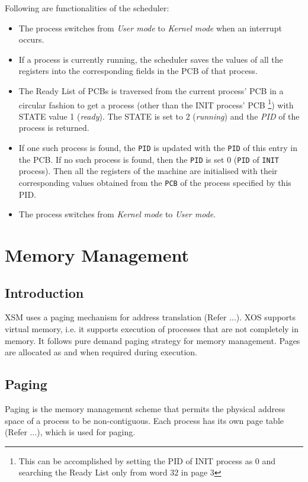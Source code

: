 \documentclass[10pt]{report}
\begin{document}
Following are functionalities of the scheduler:
\begin{itemize}
	\item The process switches from \textit{User mode} to \textit{Kernel mode} when an interrupt occurs.
	\item If a process is currently running, the scheduler saves the values of all the registers into the corresponding fields in the PCB of that process.
	\item The Ready List of PCBs is traversed from the current process' PCB in a circular fashion to get a process (other than the INIT process' PCB \footnote{This can be accomplished by setting the PID of INIT process as 0 and searching  the Ready List only from word 32 in page 3}) with STATE value 1 (\textit{ready}). The STATE is set to 2 (\textit{running}) and the \textit{PID} of the process is returned.
	\item If one such process is found, the \texttt{PID} is updated with the \texttt{PID} of this entry in the PCB. If no such process is found, then the \texttt{PID} is set 0 (\texttt{PID} of \texttt{INIT} process). Then all the registers of the machine are initialised with their corresponding values obtained from the \texttt{PCB} of the process specified by this PID.
	
	\item The process switches from \textit{Kernel mode} to \textit{User mode}.
\end{itemize}

\chapter{Memory Management}
\section{Introduction}

XSM uses a paging mechanism for address translation (Refer ...). XOS supports virtual memory, i.e. it supports execution of processes that are not completely in memory. It follows pure demand paging strategy for memory management. Pages are allocated as and when required during execution. 

\section{Paging}

Paging is the memory management scheme that permits the physical address space of a process to be non-contiguous. Each process has its own page table (Refer ...), which is used for paging. 
\end{document}
